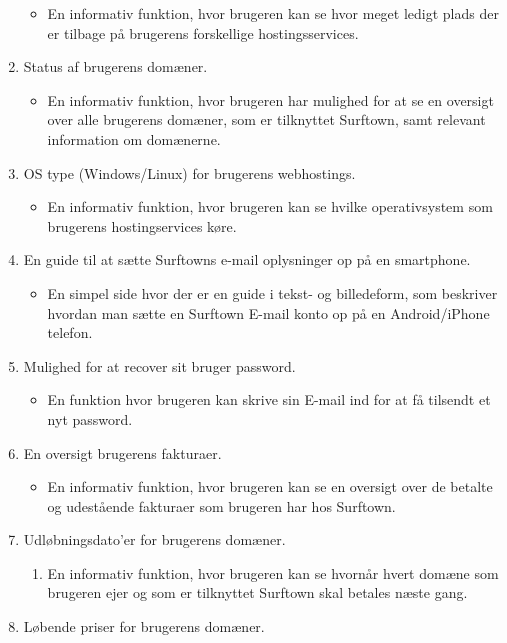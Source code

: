 \documentclass[12pt]{article}
\begin{document}
\begin{enumerate}
\begin{itemize}
		\item{En informativ funktion, hvor brugeren kan se hvor meget ledigt plads der er tilbage på brugerens forskellige hostingsservices.}
	\end{itemize}
  \item{Status af brugerens domæner.}
	\begin{itemize}
		\item{En informativ funktion, hvor brugeren har mulighed for at se en oversigt over alle brugerens domæner, som er tilknyttet Surftown, samt relevant information om domænerne.}
	\end{itemize}
  \item{OS type (Windows/Linux) for brugerens webhostings.}
	\begin{itemize}
		\item{En informativ funktion, hvor brugeren kan se hvilke operativsystem som brugerens hostingservices køre.}
	\end{itemize}
  \item{En guide til at sætte Surftowns e-mail oplysninger op på en smartphone.}
	\begin{itemize}
		\item{En simpel side hvor der er en guide i tekst- og billedeform, som beskriver hvordan man sætte en Surftown E-mail konto op på en Android/iPhone telefon.}
	\end{itemize}
  \item{Mulighed for at recover sit bruger password.}
	\begin{itemize}
		\item{En funktion hvor brugeren kan skrive sin E-mail ind for at få tilsendt et nyt password.}
	\end{itemize}
  \item{En oversigt brugerens fakturaer.}
	\begin{itemize}
		\item{En informativ funktion, hvor brugeren kan se en oversigt over de betalte og udestående fakturaer som brugeren har hos Surftown.}
	\end{itemize}
  \item{Udløbningsdato'er for brugerens domæner.}
	\begin{enumerate}
		\item{En informativ funktion, hvor brugeren kan se hvornår hvert domæne som brugeren ejer og som er tilknyttet Surftown skal betales næste gang.}
	\end{enumerate}
  \item{Løbende priser for brugerens domæner.}

\end{enumerate}
\end{document}
